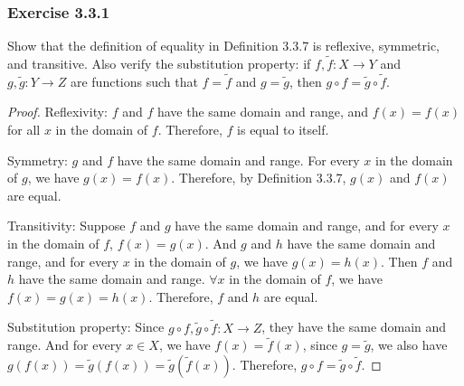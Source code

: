 \documentclass[12pt, letter]{article}
\begin{document}
\subsubsection*{Exercise 3.3.1}
Show that the definition of equality in Definition 3.3.7 is reflexive, symmetric, and transitive. Also verify the substitution property: if 
$f,\tilde{f}:X\to Y$ and $g,\tilde{g}:Y\to Z$ are functions such that $f=\tilde{f}$ and $g=\tilde{g}$, then $g\circ f=\tilde{g}\circ\tilde{f}$.
\begin{proof}
    Reflexivity: $f$ and $f$ have the same domain and range, and $f(x)=f(x)$ for all $x$ in the domain of $f$. Therefore, $f$ is equal to itself.

    Symmetry: $g$ and $f$ have the same domain and range. For every $x$ in the domain of $g$, we have $g(x)=f(x)$. Therefore, by Definition 3.3.7, $g(x)$ and 
    $f(x)$ are equal.

    Transitivity: Suppose $f$ and $g$ have the same domain and range, and for every $x$ in the domain of $f$, $f(x)=g(x)$. And $g$ and $h$ have the same domain and range, and 
    for every $x$ in the domain of $g$, we have $g(x)=h(x)$. Then $f$ and $h$ have the same domain and range. $\forall x$ in the domain of $f$, we have $f(x)=g(x)=h(x)$. Therefore, 
    $f$ and $h$ are equal.

    Substitution property: Since $g\circ f, \tilde{g}\circ \tilde{f}:X\to Z$, they have the same domain and range. And for every $x\in X$, we have $f(x)=\tilde{f}(x)$, since $g=\tilde{g}$, we also have
    $g(f(x))=\tilde{g}(f(x))=\tilde{g}(\tilde{f}(x))$. Therefore, $g\circ f=\tilde{g}\circ\tilde{f}$.
\end{proof}
\end{document}
